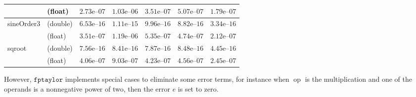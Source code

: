 \documentclass[a4paper,10pt]{article}
\DeclareMathOperator{\op}{op}
\newcommand{\fptaylor}{\mathtt{fptaylor}}
\theoremstyle{plain}
\theoremstyle{definition}
\theoremstyle{remark}
\begin{document}
\begin{table}[!ht]
\begin{center}
\begin{tabular}{p{2.3cm}lccccc}
& (float) & $2.73\text{e--}07$ & $1.03\text{e--}06$ & $3.51\text{e--}07$ & $5.07\text{e--}07$ & $1.79\text{e--}07$\\
\hline
\multirow{2}{*}{sineOrder3}
& (double) & $6.53\text{e--}16$ & $1.11\text{e--}15$ & $9.96\text{e--}16$ & $8.82\text{e--}16$ & $3.34\text{e--}16$\\
& (float) & $3.51\text{e--}07$ & $1.19\text{e--}06$ & $5.35\text{e--}07$ & $4.74\text{e--}07$ & $2.12\text{e--}07$\\
\hline
\multirow{2}{*}{sqroot}
& (double) & $7.56\text{e--}16$ & $8.41\text{e--}16$ & $7.87\text{e--}16$ & $8.48\text{e--}16$ & $4.45\text{e--}16$\\
& (float) & $4.06\text{e--}07$ & $9.03\text{e--}07$ & $4.23\text{e--}07$ & $4.56\text{e--}07$ & $2.45\text{e--}07$\\
\hline
\end{tabular}
\label{table:error}
\end{center}
\end{table}


However, $\fptaylor$ implements special cases to eliminate some error terms, for instance when $\op$ is the multiplication and one of the operands is a nonnegative power of two, then the error $e$ is set to zero. 
\end{document}
